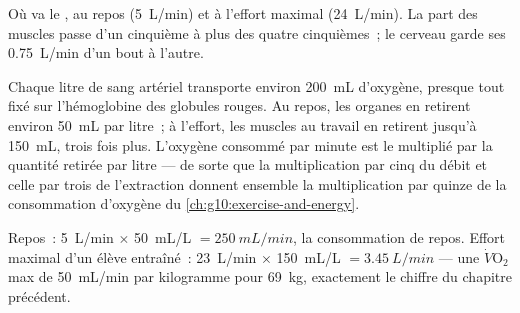 \begin{omfigure}

{\small Où va le , au repos (\qty{5}{L/min}) et à
l'effort maximal (\qty{24}{L/min}). La part des muscles passe d'un
cinquième à plus des quatre cinquièmes~; le cerveau garde ses
\qty{0.75}{L/min} d'un bout à l'autre.}
\end{omfigure}

\begin{proposition}\label{prop:g10:heart-lungs-effort:extraction}
Chaque litre de sang artériel transporte environ \qty{200}{mL}
d'oxygène, presque tout fixé sur l'hémoglobine des globules rouges. Au
repos, les organes en retirent environ \qty{50}{mL} par litre~; à
l'effort, les muscles au travail en retirent jusqu'à \qty{150}{mL},
trois fois plus. L'oxygène consommé par minute est le 
multiplié par la quantité retirée par litre --- de sorte que la
multiplication par cinq du débit et celle par trois de l'extraction
donnent ensemble la multiplication par quinze de la consommation
d'oxygène du \cref{ch:g10:exercise-and-energy}.
\end{proposition}
\admitted

\begin{example}\label{ex:g10:heart-lungs-effort:fick}
Repos~: \qty{5}{L/min} $\times$ \qty{50}{mL/L} $= \qty{250}{mL/min}$,
la consommation de repos. Effort maximal d'un élève entraîné~:
\qty{23}{L/min} $\times$ \qty{150}{mL/L} $= \qty{3.45}{L/min}$ --- une
$\dot V\!\mathrm{O_2}$max de \qty{50}{mL/min} par kilogramme pour
\qty{69}{kg}, exactement le chiffre du chapitre précédent.
\end{example}

